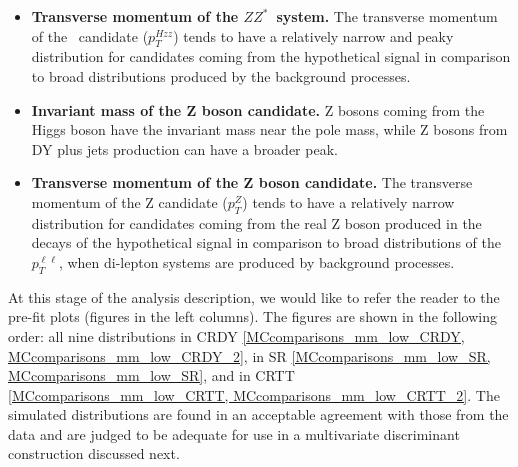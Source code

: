 \begin{itemize}
\item{\bfseries Transverse momentum of the $ZZ^*$~system.} 
The transverse momentum of the \HZZ~candidate ($p_T^{Hzz}$) tends to have a relatively narrow and peaky distribution for candidates coming from the hypothetical signal in comparison to broad distributions produced by the background processes. 

\item{\bfseries Invariant mass of the Z boson candidate.} 
Z bosons coming from the Higgs boson have the invariant mass near the pole mass, while Z bosons from DY plus jets production can have a broader peak.

\item{\bfseries Transverse momentum of the Z boson candidate.} 
The transverse momentum of the Z candidate ($p_T^Z$) tends to have a relatively narrow distribution for candidates coming from the real Z boson produced in the decays of the hypothetical signal in comparison to broad distributions of the $p_T^{\ell\ell}$, when di-lepton systems are produced by background processes. 

\end{itemize}

At this stage of the analysis description, we would like to refer the reader to the pre-fit plots (figures in the left columns). The figures are shown in the following order: all nine distributions in CRDY \ref{MCcomparisons_mm_low_CRDY, MCcomparisons_mm_low_CRDY_2}, in SR \ref{MCcomparisons_mm_low_SR, MCcomparisons_mm_low_SR}, and in CRTT \ref{MCcomparisons_mm_low_CRTT, MCcomparisons_mm_low_CRTT_2}. The simulated distributions are found in an acceptable agreement with those from the data and are judged to be adequate for use in a multivariate discriminant construction discussed next. 

